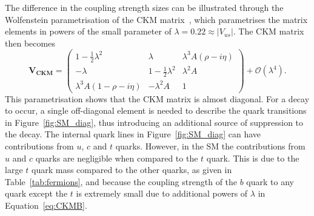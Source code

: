 The difference in the coupling strength sizes can be illustrated through the Wolfenstein parametrisation of the CKM matrix~\cite{PhysRevLett.51.1945}, which parametrises the matrix elements in powers of the small parameter of $\lambda = 0.22 \approx |V_{us}|$. The CKM matrix then becomes
\begin{equation}
\mathbf{V_{CKM}} =
 \begin{pmatrix}
 1 - \frac{1}{2}\lambda^2 & \lambda & \lambda^3 A (\rho - i \eta) \\
 - \lambda                & 1 - \frac{1}{2}\lambda^2 & \lambda^2 A \\
 \lambda^3 A (1 - \rho- i \eta) & -\lambda^2 A & 1
 \end{pmatrix} + \mathcal{O}(\lambda^4).
\label{eq:CKMB}
\end{equation}
This parametrisation shows that the CKM matrix is almost diagonal. For a \bmumu decay to occur, a single off-diagonal element is needed to describe the quark transitions in Figure~\ref{fig:SM_diag}, thus introducing an additional source of suppression to the decay. 
The internal quark lines in Figure~\ref{fig:SM_diag} can have contributions from $u$, $c$ and $t$ quarks. However, in the SM the contributions from $u$ and $c$ quarks are negligible when compared to the $t$ quark. This is due to the large $t$ quark mass compared to the other quarks, as given in Table~\ref{tab:fermions}, and because the coupling strength of the $b$ quark to any quark except the $t$ is extremely small due to additional powers of $\lambda$ in Equation~\ref{eq:CKMB}.


